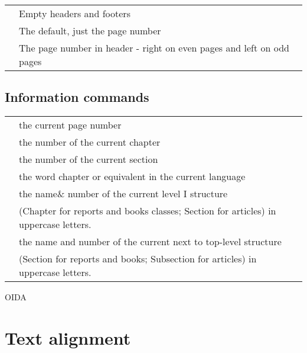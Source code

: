 \documentclass[11pt,a4paper]{report}
\newcommand{\justexplain}[2]{\code{#1} & #2\\}
\begin{document}
{\begin{longtable}{l l}
\justexplain{empty}{Empty headers and footers}
\justexplain{plain}{The default, just the page number}
\justexplain{myheadings}{The page number in header - right on even pages and left on odd pages}
\end{longtable}

\subsection{Information commands}
\begin{longtable}{l l}
  \justexplain{\thepage}{the current page number}
  \justexplain{\thechapter}{the number of the current chapter}
  \justexplain{\thesection}{the number of the current section}
  \justexplain{\chaptername}{the word chapter or equivalent in the current language}
  \justexplain{\leftmark}{the name\& number of the current level I structure \\& (Chapter for reports and books classes; Section for articles) in uppercase letters.}
  \justexplain{\rightmark}{the name and number of the current next to top-level structure\\& (Section for reports and books; Subsection for articles) in uppercase letters. }
\end{longtable}

OIDA

\section{Text alignment}


 \\
 \\

}
\end{document}

